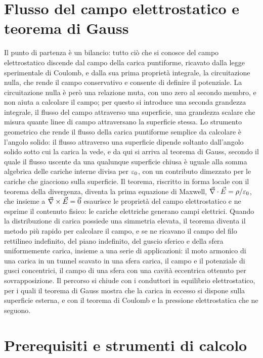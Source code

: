 \documentclass[11pt,a4paper]{article}
\begin{document}
\section*{Flusso del campo elettrostatico e teorema di Gauss}

Il punto di partenza è un bilancio: tutto ciò che si conosce del campo elettrostatico discende dal campo della carica puntiforme, ricavato dalla legge sperimentale di Coulomb, e dalla sua prima proprietà integrale, la circuitazione nulla, che rende il campo conservativo e consente di definire il potenziale. La circuitazione nulla è però una relazione muta, con uno zero al secondo membro, e non aiuta a calcolare il campo; per questo si introduce una seconda grandezza integrale, il flusso del campo attraverso una superficie, una grandezza scalare che misura quante linee di campo attraversano la superficie stessa. Lo strumento geometrico che rende il flusso della carica puntiforme semplice da calcolare è l'angolo solido: il flusso attraverso una superficie dipende soltanto dall'angolo solido sotto cui la carica la vede, e da qui si arriva al teorema di Gauss, secondo il quale il flusso uscente da una qualunque superficie chiusa è uguale alla somma algebrica delle cariche interne divisa per $\varepsilon_0$, con un contributo dimezzato per le cariche che giacciono sulla superficie. Il teorema, riscritto in forma locale con il teorema della divergenza, diventa la prima equazione di Maxwell, $\vec{\nabla}\cdot\vec{E}=\rho/\varepsilon_0$, che insieme a $\vec{\nabla}\times\vec{E}=\vec{0}$ esaurisce le proprietà del campo elettrostatico e ne esprime il contenuto fisico: le cariche elettriche generano campi elettrici. Quando la distribuzione di carica possiede una simmetria elevata, il teorema diventa il metodo più rapido per calcolare il campo, e se ne ricavano il campo del filo rettilineo indefinito, del piano indefinito, del guscio sferico e della sfera uniformemente carica, insieme a una serie di applicazioni: il moto armonico di una carica in un tunnel scavato in una sfera carica, il campo e il potenziale di gusci concentrici, il campo di una sfera con una cavità eccentrica ottenuto per sovrapposizione. Il percorso si chiude con i conduttori in equilibrio elettrostatico, per i quali il teorema di Gauss mostra che la carica in eccesso si dispone sulla superficie esterna, e con il teorema di Coulomb e la pressione elettrostatica che ne seguono.

\section*{Prerequisiti e strumenti di calcolo}
\end{document}
